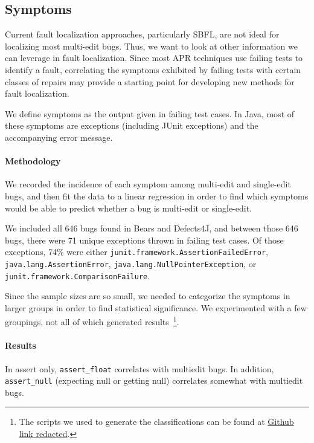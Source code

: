 \subsection{Symptoms}


Current fault localization approaches, particularly SBFL, are not ideal for localizing most multi-edit 
bugs. Thus, we want to look at other information we can leverage in fault localization. Since most 
APR techniques use failing tests to identify a fault, correlating the symptoms exhibited by failing 
tests with certain classes of repairs may provide a starting point for developing new methods for 
fault localization.

We define symptoms as the output given in failing test cases. In Java, most of 
these symptoms are exceptions (including JUnit exceptions) and the accompanying error message.

\paragraph{Methodology}
We recorded the incidence of each symptom among multi-edit and single-edit bugs, and then fit the 
data to a linear regression in order to find which symptoms would be able to predict whether a bug 
is multi-edit or single-edit.

We included all 646 bugs found in Bears and Defects4J, and between those 646 bugs, there were 
71 unique exceptions thrown in failing test cases. Of those exceptions, 74\% were either 
\texttt{junit.framework.AssertionFailedError}, \texttt{java.lang.AssertionError}, 
\texttt{java.lang.NullPointerException}, or \texttt{junit.framework.ComparisonFailure}.

Since the sample sizes are so small, we needed to categorize the symptoms in larger groups in order 
to find statistical significance. We experimented with a few groupings, not all of which generated 
results~\footnote{The scripts we used to generate the classifications can be found at \url{Github link 
redacted}.}.  



\paragraph{Results}
In assert only, \lstinline{assert_float} correlates with multiedit bugs. In addition, \lstinline{assert_null} (expecting null or getting null) correlates somewhat with multiedit bugs.

